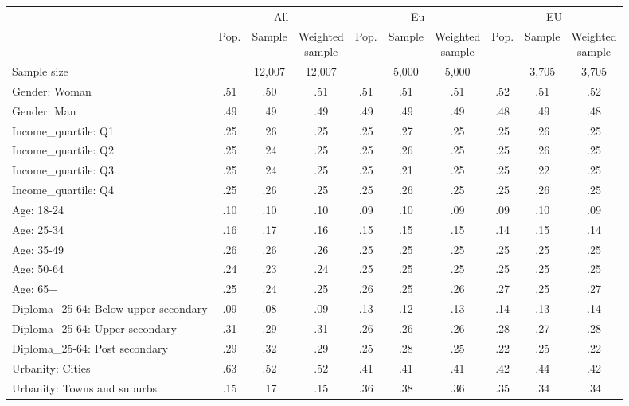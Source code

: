 
\begin{tabular}[t]{lccccccccc}
\toprule
\multicolumn{1}{c}{} & \multicolumn{3}{c}{All} & \multicolumn{3}{c}{Eu} & \multicolumn{3}{c}{EU} \\
\cmidrule(l{3pt}r{3pt}){2-4} \cmidrule(l{3pt}r{3pt}){5-7} \cmidrule(l{3pt}r{3pt}){8-10}
  & Pop. & Sample & \makecell{Weighted\\sample} & Pop. & Sample & \makecell{Weighted\\sample} & Pop. & Sample & \makecell{Weighted\\sample}\\
\midrule
Sample size &  & 12,007 & 12,007 &  & 5,000 & 5,000 &  & 3,705 & 3,705\\
\addlinespace
Gender: Woman & .51 & .50 & .51 & .51 & .51 & .51 & .52 & .51 & .52\\
Gender: Man & .49 & .49 & .49 & .49 & .49 & .49 & .48 & .49 & .48\\
\addlinespace
Income\_quartile: Q1 & .25 & .26 & .25 & .25 & .27 & .25 & .25 & .26 & .25\\
Income\_quartile: Q2 & .25 & .24 & .25 & .25 & .26 & .25 & .25 & .26 & .25\\
Income\_quartile: Q3 & .25 & .24 & .25 & .25 & .21 & .25 & .25 & .22 & .25\\
Income\_quartile: Q4 & .25 & .26 & .25 & .25 & .26 & .25 & .25 & .26 & .25\\
\addlinespace
Age: 18-24 & .10 & .10 & .10 & .09 & .10 & .09 & .09 & .10 & .09\\
Age: 25-34 & .16 & .17 & .16 & .15 & .15 & .15 & .14 & .15 & .14\\
Age: 35-49 & .26 & .26 & .26 & .25 & .25 & .25 & .25 & .25 & .25\\
Age: 50-64 & .24 & .23 & .24 & .25 & .25 & .25 & .25 & .25 & .25\\
Age: 65+ & .25 & .24 & .25 & .26 & .25 & .26 & .27 & .25 & .27\\
\addlinespace
Diploma\_25-64: Below upper secondary & .09 & .08 & .09 & .13 & .12 & .13 & .14 & .13 & .14\\
Diploma\_25-64: Upper secondary & .31 & .29 & .31 & .26 & .26 & .26 & .28 & .27 & .28\\
Diploma\_25-64: Post secondary & .29 & .32 & .29 & .25 & .28 & .25 & .22 & .25 & .22\\
\addlinespace
Urbanity: Cities & .63 & .52 & .52 & .41 & .41 & .41 & .42 & .44 & .42\\
Urbanity: Towns and suburbs & .15 & .17 & .15 & .36 & .38 & .36 & .35 & .34 & .34\\

\end{tabular}
